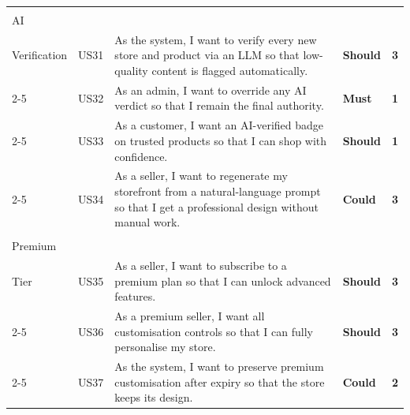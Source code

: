 \begin{longtable}{|>{\centering\arraybackslash\small}p{2.2cm}|>{\centering\arraybackslash\small}p{0.9cm}|>{\small}p{7.4cm}|>{\centering\arraybackslash\small}p{1.3cm}|>{\centering\arraybackslash\small}p{0.6cm}|}
  \cellcolor{featAI}\makecell[c]{\textbf{F6}\\\small AI\\Verification}
  & US31 & As the system, I want to verify every new store and product via an LLM so that low-quality content is flagged automatically. & \cellcolor{moscowShould}\textbf{Should} & \cellcolor{complexHigh}\textbf{3} \\\cline{2-5}
  \cellcolor{featAI} & US32 & As an admin, I want to override any AI verdict so that I remain the final authority. & \cellcolor{moscowMust}\textbf{Must} & \cellcolor{complexLow}\textbf{1} \\\cline{2-5}
  \cellcolor{featAI} & US33 & As a customer, I want an AI-verified badge on trusted products so that I can shop with confidence. & \cellcolor{moscowShould}\textbf{Should} & \cellcolor{complexLow}\textbf{1} \\\cline{2-5}
  \cellcolor{featAI} & US34 & As a seller, I want to regenerate my storefront from a natural-language prompt so that I get a professional design without manual work. & \cellcolor{moscowCould}\textbf{Could} & \cellcolor{complexHigh}\textbf{3} \\\hline

  \cellcolor{featPremium}\makecell[c]{\textbf{F7}\\\small Premium\\Tier}
  & US35 & As a seller, I want to subscribe to a premium plan so that I can unlock advanced features. & \cellcolor{moscowShould}\textbf{Should} & \cellcolor{complexHigh}\textbf{3} \\\cline{2-5}
  \cellcolor{featPremium} & US36 & As a premium seller, I want all customisation controls so that I can fully personalise my store. & \cellcolor{moscowShould}\textbf{Should} & \cellcolor{complexHigh}\textbf{3} \\\cline{2-5}
  \cellcolor{featPremium} & US37 & As the system, I want to preserve premium customisation after expiry so that the store keeps its design. & \cellcolor{moscowCould}\textbf{Could} & \cellcolor{complexMed}\textbf{2} \\\hline


\end{longtable}
